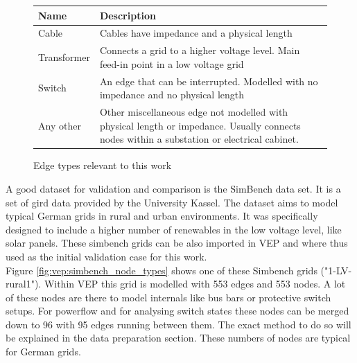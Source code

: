 \begin{figure}[H]
    \begin{tabular}{l p{10cm}}
        Name & Description\\
        \hline
        Cable & Cables have impedance and a physical length\\
        Transformer & Connects a grid to a higher voltage level. Main feed-in point in a low voltage grid\\
        Switch & An edge that can be interrupted. Modelled with no impedance and no physical length\\
        Any other & Other miscellaneous edge not modelled with physical length or impedance. Usually connects nodes within a substation or electrical cabinet.
      \end{tabular}
    \caption{Edge types relevant to this work}
    \label{table:vep:edges}
\end{figure}

A good dataset for validation and comparison is the SimBench data set. It is a set of
gird data provided by the University Kassel. The dataset aims to model typical German
grids in rural and urban environments. It was specifically designed to include a higher
number of renewables in the low voltage level, like solar panels\autocite{simbench}. These
simbench grids can be also imported in VEP and where thus used as the initial validation case
for this work.\\

Figure \ref{fig:vep:simbench_node_types} shows one of these Simbench grids ("1-LV-rural1"). 
Within VEP this grid is modelled with 553 edges and 553 nodes. A lot of these nodes are there to model
internals like bus bars or protective switch setups. For powerflow and for analysing
switch states these nodes can be merged down to 96 with 95 edges running between them. 
The exact method to do so will be explained in the data preparation section. These numbers of nodes
are typical for German grids\autocite{venios}.

